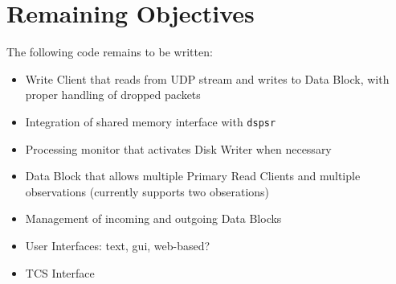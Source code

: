 \chapter{Remaining Objectives}
\label{app:dada_todo}

The following code remains to be written:

\begin{itemize}

\item Write Client that reads from UDP stream and writes to Data Block,
      with proper handling of dropped packets

\item Integration of shared memory interface with {\tt dspsr}

\item Processing monitor that activates Disk Writer when necessary

\item Data Block that allows multiple Primary Read Clients and multiple
      observations (currently supports two obserations)

\item Management of incoming and outgoing Data Blocks 

\item User Interfaces: text, gui, web-based?

\item TCS Interface

\end{itemize}

